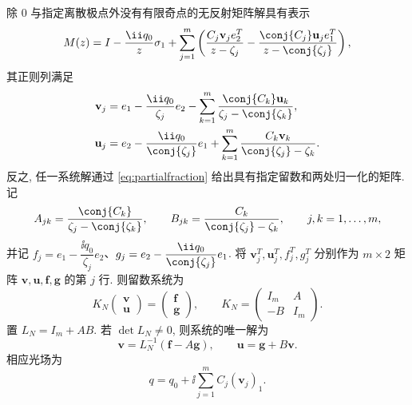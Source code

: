 \begin{proposition}[留数系统]\label{prop:finite}
除 $0$ 与指定离散极点外没有有限奇点的无反射矩阵解具有表示
\begin{equation}\label{eq:partialfraction}
M(z)=I-\dfrac{\ii q_0}{z}\sigma_1+\sum\limits_{j=1}^{m}
\left(\dfrac{C_j\mathbf v_je_2^T}{z-\zeta_j}
-\dfrac{\conj{C_j}\mathbf u_je_1^T}{z-\conj{\zeta_j}}\right),
\end{equation}
其正则列满足
\begin{align}
\mathbf v_j&=e_1-\dfrac{\ii q_0}{\zeta_j}e_2
-\sum\limits_{k=1}^{m}\dfrac{\conj{C_k}\mathbf u_k}{\zeta_j-\conj{\zeta_k}},\label{eq:finite1}\\
\mathbf u_j&=e_2-\dfrac{\ii q_0}{\conj{\zeta_j}}e_1
+\sum\limits_{k=1}^{m}\dfrac{C_k\mathbf v_k}{\conj{\zeta_j}-\zeta_k}.\label{eq:finite2}
\end{align}
反之, 任一系统解通过 \eqref{eq:partialfraction} 给出具有指定留数和两处归一化的矩阵. 记
\[
A_{jk}=\dfrac{\conj{C_k}}{\zeta_j-\conj{\zeta_k}},\qquad
B_{jk}=\dfrac{C_k}{\conj{\zeta_j}-\zeta_k},\qquad j,k=1,\ldots,m,
\]
并记 $f_j=e_1-\dfrac{\ii q_0}{\zeta_j}e_2$、$g_j=e_2-\dfrac{\ii q_0}{\conj{\zeta_j}}e_1$. 将 $\mathbf v_j^T,\mathbf u_j^T,f_j^T,g_j^T$ 分别作为 $m\times2$ 矩阵 $\boldsymbol v,\boldsymbol u,\boldsymbol f,\boldsymbol g$ 的第 $j$ 行. 则留数系统为
\begin{equation}\label{eq:N-block-system}
K_N\begin{pmatrix}\boldsymbol v\\\boldsymbol u\end{pmatrix}
=\begin{pmatrix}\boldsymbol f\\\boldsymbol g\end{pmatrix},\qquad
K_N=\begin{pmatrix}I_m&A\\-B&I_m\end{pmatrix}.
\end{equation}
置 $L_N=I_m+AB$. 若 $\det L_N\ne0$, 则系统的唯一解为
\begin{equation}\label{eq:finite-schur}
\boldsymbol v=L_N^{-1}(\boldsymbol f-A\boldsymbol g),\qquad
\boldsymbol u=\boldsymbol g+B\boldsymbol v.
\end{equation}
相应光场为
\begin{equation}\label{eq:qfinite}
q=q_0+\ii\sum\limits_{j=1}^{m}C_j(\mathbf v_j)_1.
\end{equation}
\end{proposition}
